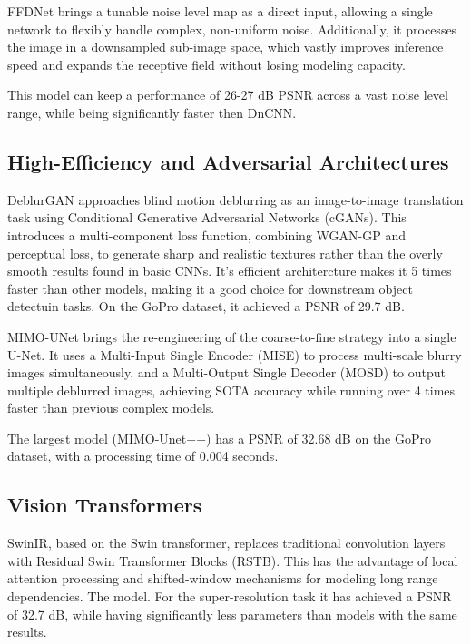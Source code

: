 \documentclass[conference]{IEEEtran}
\begin{document}
FFDNet brings a tunable noise level map as a direct input, allowing a single network to flexibly
handle complex, non-uniform noise. Additionally, it processes the image in a downsampled sub-image
space, which vastly improves inference speed and expands the receptive field without losing modeling
capacity. \cite{FFDNet}

This model can keep a performance of 26-27 dB PSNR across a vast noise level range, while being
significantly faster then DnCNN.

\subsection{High-Efficiency and Adversarial Architectures}

DeblurGAN approaches blind motion deblurring as an image-to-image translation task using Conditional
Generative Adversarial Networks (cGANs). This introduces a multi-component loss function, combining
WGAN-GP and perceptual loss, to generate sharp and realistic textures rather than the overly smooth
results found in basic CNNs. It's efficient architercture makes it 5 times faster than other models,
making it a good choice for downstream object detectuin tasks. On the GoPro dataset, it achieved a
PSNR of 29.7 dB. \cite{Deblurgan}

MIMO-UNet brings the re-engineering of the coarse-to-fine strategy into a single U-Net. It uses a
Multi-Input Single Encoder (MISE) to process multi-scale blurry images simultaneously, and a
Multi-Output Single Decoder (MOSD) to output multiple deblurred images, achieving SOTA accuracy
while running over 4 times faster than previous complex models. \cite{Rethinking}

The largest model (MIMO-Unet++) has a PSNR of 32.68 dB on the GoPro dataset, with a processing time
of 0.004 seconds.

\subsection{Vision Transformers}

SwinIR, based on the Swin transformer, replaces traditional convolution layers with Residual Swin
Transformer Blocks (RSTB). This has the advantage of local attention processing and shifted-window
mechanisms for modeling long range dependencies. The model. For the super-resolution task it has
achieved a PSNR of 32.7 dB, while having significantly less parameters than models with the same
results. \cite{Swinir}
\end{document}
